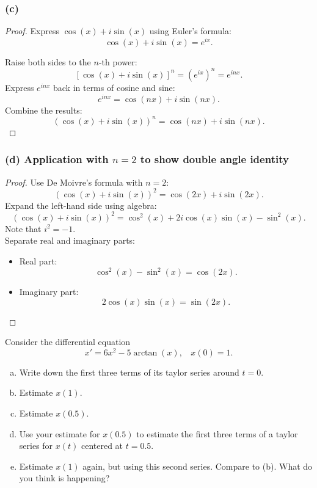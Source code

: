 \documentclass{article}
\begin{document}
\subsubsection*{(c)}
\begin{proof}
    Express \( \cos(x) + i \sin(x) \) using Euler's formula:
    \[
        \cos(x) + i \sin(x) = e^{ix}.
    \]

    Raise both sides to the \( n \)-th power:
    \[
        [\cos(x) + i \sin(x)]^n = (e^{ix})^n = e^{inx}.
    \]
    Express \( e^{inx} \) back in terms of cosine and sine:
    \[
        e^{inx} = \cos(nx) + i \sin(nx).
    \]
    Combine the results:
    \[
        (\cos(x) + i \sin(x))^n = \cos(nx) + i \sin(nx).
    \]
\end{proof}

\subsubsection*{(d) Application with $n = 2$ to show double angle identity}
\begin{proof}
    Use De Moivre's formula with \( n = 2 \):
    \[
        (\cos(x) + i \sin(x))^2 = \cos(2x) + i \sin(2x).
    \]
    Expand the left-hand side using algebra:
    \[
        (\cos(x) + i \sin(x))^2 = \cos^2(x) + 2i \cos(x) \sin(x) - \sin^2(x).
    \]
    Note that \( i^2 = -1 \). 
    \\
    Separate real and imaginary parts:
    \begin{itemize}
        \item Real part:
        \[
        \cos^2(x) - \sin^2(x) = \cos(2x).
        \]
        \item Imaginary part:
        \[
        2 \cos(x) \sin(x) = \sin(2x).
        \]
    \end{itemize}
\end{proof}


\begin{problem}
    Consider the differential equation
    \[x' = 6x^2 - 5\arctan(x),\ \ \ \ x(0) = 1.\]
    
    \begin{enumerate}[a)]
        \item Write down the first three terms of its taylor series around \(t=0\).
        \item Estimate \(x(1)\).
        \item Estimate \(x(0.5)\).
        \item Use your estimate for \(x(0.5)\) to estimate the first three terms of a taylor series for \(x(t)\) centered at \(t=0.5\).
        \item Estimate \(x(1)\) again, but using this second series. Compare to (b). What do you think is happening?
    \end{enumerate}
\end{problem}
\end{document}
